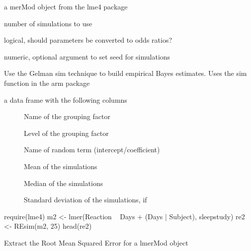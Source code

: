 \documentclass[letterpaper]{book}
\begin{document}
%
\begin{Arguments}
\begin{ldescription}
\item[\code{merMod}] a merMod object from the lme4 package

\item[\code{n.sims}] number of simulations to use

\item[\code{oddsRatio}] logical, should parameters be converted to odds ratios?

\item[\code{seed}] numeric, optional argument to set seed for simulations
\end{ldescription}
\end{Arguments}
%
\begin{Details}\relax
Use the Gelman sim technique to build empirical Bayes estimates.
Uses the sim function in the arm package
\end{Details}
%
\begin{Value}
a data frame with the following columns
\begin{description}

\item[] Name of the grouping factor
\item[] Level of the grouping factor
\item[] Name of random term (intercept/coefficient)
\item[] Mean of the simulations
\item[] Median of the simulations
\item[] Standard deviation of the simulations,  if 

\end{description}

\end{Value}
%
\begin{Examples}
\begin{ExampleCode}
require(lme4)
m2 <- lmer(Reaction ~ Days + (Days | Subject), sleepstudy)
re2 <- REsim(m2, 25)
head(re2)
\end{ExampleCode}
\end{Examples}
%
\begin{Description}\relax
Extract the Root Mean Squared Error for a lmerMod object
\end{Description}
\end{document}
